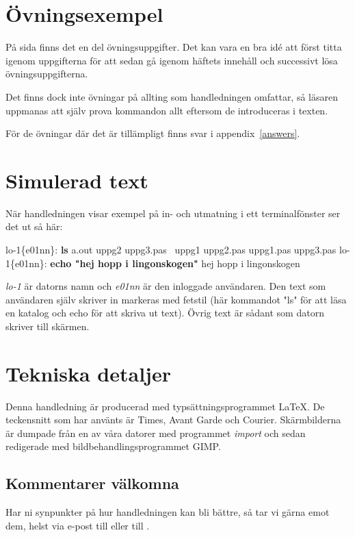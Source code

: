 \documentclass[a4paper,twocolumn]{book}
\begin{document}
\section*{Övningsexempel}

På sida \pageref{cha:uppgifter} finns det en del övningsuppgifter.
Det kan vara en bra idé att först titta igenom uppgifterna för att sedan
gå igenom häftets innehåll och successivt lösa övningsuppgifterna.

Det finns dock inte övningar på
allting som handledningen omfattar, så läsaren uppmanas att själv
prova kommandon allt eftersom de introduceras i texten.

För de övningar där det är tillämpligt finns svar i
appendix~\ref{answers}.

\section*{Simulerad text}

När handledningen visar exempel på in- och utmatning i ett
terminalfönster ser det ut så här:
\begin{example}
lo-1\{e01nn\}: \textbf{ls}              
a.out        uppg2        uppg3.pas~
uppg1        uppg2.pas
uppg1.pas    uppg3.pas
lo-1\{e01nn\}: \textbf{echo "hej hopp i lingonskogen"}
hej hopp i lingonskogen
\end{example}
\emph{lo-1} är datorns namn och \emph{e01nn} är den inloggade användaren. Den text som användaren själv skriver in markeras med fetstil (här kommandot "ls" för att läsa en katalog och echo för att skriva ut text). Övrig text är sådant som datorn skriver till skärmen.

\section*{Tekniska detaljer}

Denna handledning är producerad med typsättningsprogrammet \LaTeX. De
teckensnitt som har använts är Times, Avant Garde och Courier.
Skärmbilderna är dumpade från en av våra datorer med programmet
\emph{import} och sedan redigerade med bildbehandlingsprogrammet GIMP.

\subsection*{Kommentarer välkomna}

Har ni synpunkter på hur handledningen kan bli bättre, så tar vi
gärna emot dem, helst via e-post till  eller till
.
\end{document}
